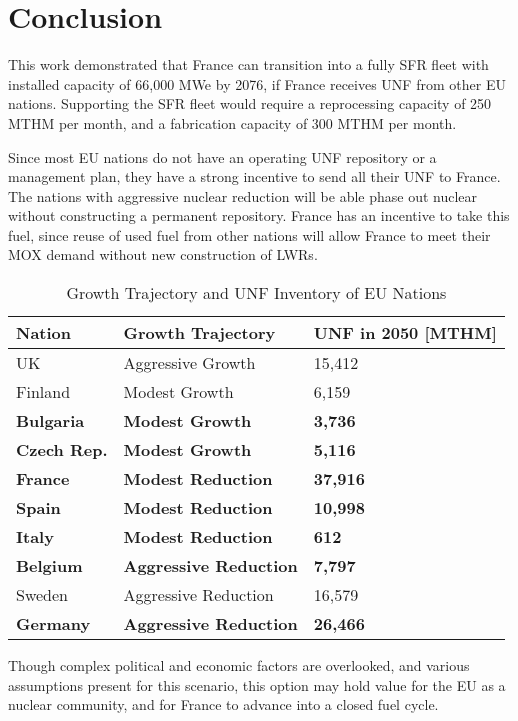 \section{Conclusion}
This work demonstrated that France can transition into
a fully \gls{SFR} fleet with installed capacity of 66,000 MWe by 2076,
if France receives \gls{UNF} from other \gls{EU} nations.
Supporting the \gls{SFR} fleet would require a reprocessing capacity of 250 MTHM per month,
and a fabrication capacity of 300 MTHM per month.

Since most \gls{EU} nations do not have an operating \gls{UNF}
repository or a management plan, they have a strong incentive
to send all their \gls{UNF} to France. The nations
with aggressive nuclear reduction will be able phase out nuclear
without constructing a permanent repository. France has an
incentive to take this fuel, since reuse of used fuel from
other nations will allow France to meet their MOX demand
without new construction of \glspl{LWR}.

\begin{table}[h]
    \centering
                \begin{tabularx}{\textwidth}{lbb}
                    \hline 
                    
                    \textbf{Nation} & \textbf{Growth Trajectory} & \small{\textbf{UNF in 2050 [MTHM] }}\\
                    \hline
                    UK & Aggressive Growth & 15,412\\
                    \hline
                    Finland & Modest Growth & 6,159\\
                    \hline
                    \textbf{Bulgaria} & \textbf{Modest Growth} & \textbf{3,736}\\
                    \hline
                    \textbf{Czech Rep.} & \textbf{Modest Growth} & \textbf{5,116}\\
                    \hline
                    \textbf{France} & \textbf{Modest Reduction} & \textbf{37,916}\\
                    \hline
                    \textbf{Spain} & \textbf{Modest Reduction} &  \textbf{10,998}\\
                    \hline
                    \textbf{Italy} & \textbf{Modest Reduction} & \textbf{612}\\
                    \hline
                    \textbf{Belgium} & \textbf{Aggressive Reduction} & \textbf{7,797}\\
                    \hline
                    Sweden & Aggressive Reduction & 16,579\\
                    \hline
                    \textbf{Germany} & \textbf{Aggressive Reduction} & \textbf{26,466}\\
                    \hline
                    
                \end{tabularx}
    \caption {Growth Trajectory and UNF Inventory of \gls{EU} Nations}
    \label{tab:which_count}
\end{table}

Though complex political and economic factors are overlooked,
 and various assumptions present for this scenario,
this option may hold value for the \gls{EU} as a nuclear community,
and for France to advance into a closed fuel cycle.

